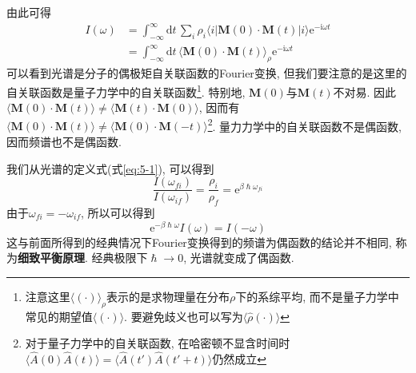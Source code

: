     由此可得
    \begin{equation}\begin{aligned}
        I(\omega) 
        &= \int_{-\infty}^{\infty} \mathrm{d}t\, \sum_{i} \rho_i \langle i|\bm{M}(0) \cdot \bm{M}(t) |i \rangle \mathrm{e}^{-\mathrm{i} \omega t} \\
        &= \int_{-\infty}^{\infty} \mathrm{d}t\, \langle \bm{M}(0) \cdot \bm{M}(t) \rangle_\rho \mathrm{e}^{-\mathrm{i} \omega t}
    \end{aligned}\end{equation}
    可以看到光谱是分子的偶极矩自关联函数的Fourier变换, 但我们要注意的是这里的自关联函数是量子力学中的自关联函数\footnote{注意这里$\langle (\cdot) \rangle_\rho$表示的是求物理量在分布$\rho$下的系综平均, 而不是量子力学中常见的期望值$\langle (\cdot) \rangle$. 要避免歧义也可以写为$\langle \hat\rho (\cdot) \rangle$}. 特别地, $\bm{M}(0)$与$\bm{M}(t)$不对易. 因此$\langle \bm{M}(0) \cdot \bm{M}(t) \rangle \neq \langle \bm{M}(t) \cdot \bm{M}(0) \rangle$, 因而有$\langle \bm{M}(0) \cdot \bm{M}(t) \rangle \neq \langle \bm{M}(0) \cdot \bm{M}(-t) \rangle$\footnote{对于量子力学中的自关联函数, 在哈密顿不显含时间时$\langle \hat A(0) \hat A(t) \rangle = \langle \hat A(t') \hat A(t'+t) \rangle$仍然成立}. 量力力学中的自关联函数不是偶函数, 因而频谱也不是偶函数.

    我们从光谱的定义式(式\ref{eq:5-1}), 可以得到
    \begin{equation}
        \frac{I(\omega_{fi})}{I(\omega_{if})} = \frac{\rho_i}{\rho_f} = \mathrm{e}^{\beta\hslash\omega_{fi}}
    \end{equation}
    由于$\omega_{fi} = - \omega_{if}$, 所以可以得到
    \begin{equation}
        \mathrm{e}^{-\beta \hslash \omega} I(\omega) = I(-\omega)
    \end{equation}
    这与前面所得到的经典情况下Fourier变换得到的频谱为偶函数的结论并不相同, 称为\textbf{细致平衡原理}. 经典极限下$\hslash \to 0$, 光谱就变成了偶函数. 
    
    
    